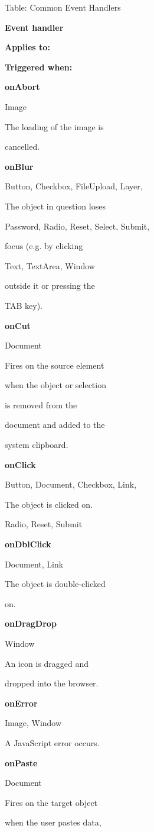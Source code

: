 \documentclass[
]{article}
\begin{document}
Table: Common Event Handlers

\textbf{Event handler}

\textbf{Applies to:}

\textbf{Triggered when:}

\textbf{onAbort}

Image

The loading of the image is

cancelled.

\textbf{onBlur}

Button, Checkbox, FileUpload, Layer,

The object in question loses

Password, Radio, Reset, Select, Submit,

focus (e.g. by clicking

Text, TextArea, Window

outside it or pressing the

TAB key).

\textbf{onCut}

Document

Fires on the source element

when the object or selection

is removed from the

document and added to the

system clipboard.

\textbf{onClick}

Button, Document, Checkbox, Link,

The object is clicked on.

Radio, Reset, Submit

\textbf{onDblClick}

Document, Link

The object is double-clicked

on.

\textbf{onDragDrop}

Window

An icon is dragged and

dropped into the browser.

\textbf{onError}

Image, Window

A JavaScript error occurs.

\textbf{onPaste}

Document

Fires on the target object

when the user pastes data,
\end{document}
